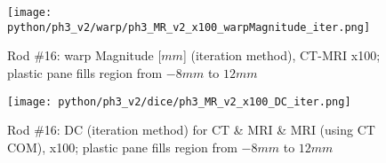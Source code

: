 \begin{figure}[!htb]
    \centering
    \texttt{[image: python/ph3\_v2/warp/ph3\_MR\_v2\_x100\_warpMagnitude\_iter.png]}
    \caption{Rod \#16: warp Magnitude [$mm$] (iteration method), CT-MRI x100; plastic pane fills region from $-8mm$ to $12mm$}
    \label{fig:ph3_warpMagnitude_x100}
\end{figure}

\begin{figure}[!htb]
     \centering
     \texttt{[image: python/ph3\_v2/dice/ph3\_MR\_v2\_x100\_DC\_iter.png]}
     \caption{Rod \#16: DC (iteration method) for CT \& MRI \& MRI (using CT COM), x100; plastic pane fills region from $-8mm$ to $12mm$}
     \label{fig:ph3_DC_x100}
\end{figure}


\cleardoublepage